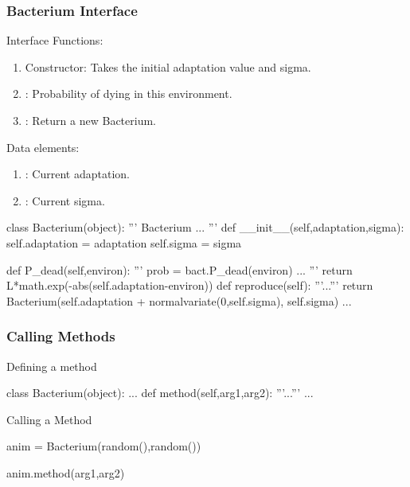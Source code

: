 \begin{frame}[fragile] 
\frametitle{Bacterium Interface}

\begin{block}{Interface}
Functions:
\begin{enumerate}
\item Constructor: Takes the initial adaptation value and sigma.
\item {}: Probability of dying in this environment.
\item {}: Return a new Bacterium.
\end{enumerate}
Data elements:
\begin{enumerate}
\item {}: Current adaptation.
\item {}: Current sigma.
\end{enumerate}
\end{block}
\end{frame}


\begin{frame}[fragile]
\begin{python}
class Bacterium(object):
    '''
    Bacterium
    ...
    '''
    def __init__(self,adaptation,sigma):
        self.adaptation = adaptation
        self.sigma = sigma
    
    def P_dead(self,environ):
        '''
        prob = bact.P_dead(environ)
        ...
        '''
        return L*math.exp(-abs(self.adaptation-environ))
    def reproduce(self):
        '''...'''
        return Bacterium(self.adaptation +
                             normalvariate(0,self.sigma),
                             self.sigma)
    ...
\end{python}
\end{frame}

\begin{frame}[fragile]
\frametitle{Calling Methods}

\begin{block}{Defining a method}
\begin{python}
class Bacterium(object):
    ...
    def method(self,arg1,arg2):
        '''...'''
        ...
\end{python}
\end{block}

\begin{block}{Calling a Method}
\begin{python}
anim = Bacterium(random(),random())

anim.method(arg1,arg2)
\end{python}
\end{block}
\end{frame}

